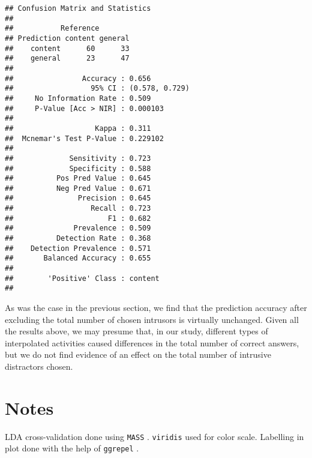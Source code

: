 \documentclass[11pt,]{article}
\begin{document}
\begin{verbatim}
## Confusion Matrix and Statistics
## 
##           Reference
## Prediction content general
##    content      60      33
##    general      23      47
##                                         
##                Accuracy : 0.656         
##                  95% CI : (0.578, 0.729)
##     No Information Rate : 0.509         
##     P-Value [Acc > NIR] : 0.000103      
##                                         
##                   Kappa : 0.311         
##  Mcnemar's Test P-Value : 0.229102      
##                                         
##             Sensitivity : 0.723         
##             Specificity : 0.588         
##          Pos Pred Value : 0.645         
##          Neg Pred Value : 0.671         
##               Precision : 0.645         
##                  Recall : 0.723         
##                      F1 : 0.682         
##              Prevalence : 0.509         
##          Detection Rate : 0.368         
##    Detection Prevalence : 0.571         
##       Balanced Accuracy : 0.655         
##                                         
##        'Positive' Class : content       
## 
\end{verbatim}

As was the case in the previous section, we find that the prediction
accuracy after excluding the total number of chosen intrusors is
virtually unchanged. Given all the results above, we may presume that,
in our study, different types of interpolated activities caused
differences in the total number of correct answers, but we do not find
evidence of an effect on the total number of intrusive distractors
chosen.

\hypertarget{notes}{%
\section{Notes}\label{notes}}

LDA cross-validation done using \texttt{MASS}
\citep{venablesModernAppliedStatistics2002}. \texttt{viridis}
\citep{garnierViridisDefaultColor2018} used for color scale. Labelling
in plot done with the help of \texttt{ggrepel}
\citep{slowikowskiGgrepelAutomaticallyPosition2018}.



\end{document}
